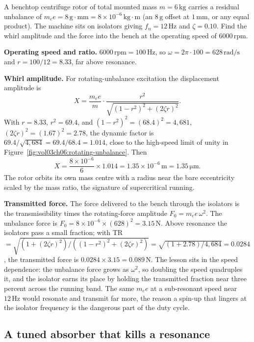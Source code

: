 A benchtop centrifuge rotor of total mounted mass $m = 6\,\si{
\kilogram}$ carries a residual unbalance of $m_e e = 8\,\si{\gram}
\cdot\si{\milli\meter} = 8\times 10^{-6}\,\si{\kilogram}\cdot\si{
\meter}$ (an $8\,\si{\gram}$ offset at $1\,\si{\milli\meter}$, or any
equal product). The machine sits on isolators giving $f_n = 12\,\si{
\hertz}$ and $\zeta = 0.10$. Find the whirl amplitude and the force
into the bench at the operating speed of $6000\,\text{rpm}$.

\textbf{Operating speed and ratio.} $6000\,\text{rpm} = 100\,\si{
\hertz}$, so $\omega = 2\pi\cdot 100 = 628\,\si{\radian\per\second}$
and $r = 100/12 = 8.33$, far above resonance.

\textbf{Whirl amplitude.} For rotating-unbalance excitation the
displacement amplitude is
\[
X = \frac{m_e e}{m}\cdot\frac{r^2}{\sqrt{(1 - r^2)^2 + (2\zeta r)^2}}.
\]
With $r = 8.33$, $r^2 = 69.4$, and $(1 - r^2)^2 = (68.4)^2 = 4{,}681$,
$(2\zeta r)^2 = (1.67)^2 = 2.78$, the dynamic factor is $69.4/\sqrt{
4{,}684} = 69.4/68.4 = 1.014$, close to the high-speed limit of unity
in Figure~\ref{fig:vol03ch06:rotating-unbalance}. Then
\[
X = \frac{8\times 10^{-6}}{6}\times 1.014 = 1.35\times 10^{-6}\,\si{
\meter} = 1.35\,\si{\micro\meter}.
\]
The rotor orbits its own mass centre with a radius near the bare
eccentricity scaled by the mass ratio, the signature of supercritical
running.



\textbf{Transmitted force.} The force delivered to the bench through
the isolators is the transmissibility times the rotating-force
amplitude $F_0 = m_e e\,\omega^2$. The unbalance force is $F_0 = 8
\times 10^{-6}\times (628)^2 = 3.15\,\text{N}$. Above resonance the
isolators pass a small fraction; with TR $= \sqrt{(1 + (2\zeta
r)^2)/((1-r^2)^2 + (2\zeta r)^2)} = \sqrt{(1 + 2.78)/4{,}684} =
0.0284$, the transmitted force is $0.0284\times 3.15 = 0.089\,\text{N}$.
The lesson sits in the speed dependence: the unbalance force grows as
$\omega^2$, so doubling the speed quadruples it, and the isolator
earns its place by holding the transmitted fraction near three percent
across the running band. The same $m_e e$ at a sub-resonant speed near
$12\,\si{\hertz}$ would resonate and transmit far more, the reason a
spin-up that lingers at the isolator frequency is the dangerous part of
the duty cycle.

\subsection{A tuned absorber that kills a resonance}

